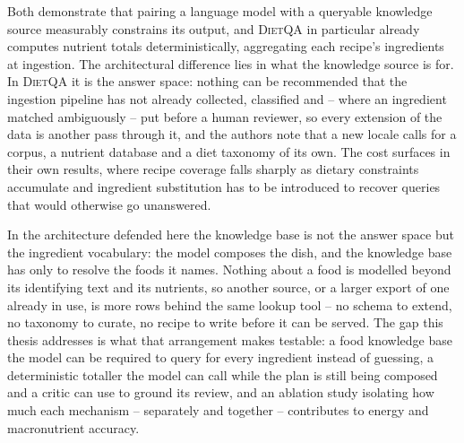 Both demonstrate that pairing a language model with a queryable knowledge source measurably constrains its output, and \textsc{DietQA} in particular already computes nutrient totals deterministically, aggregating each recipe's ingredients at ingestion. The architectural difference lies in what the knowledge source is for. In \textsc{DietQA} it is the answer space: nothing can be recommended that the ingestion pipeline has not already collected, classified and -- where an ingredient matched ambiguously -- put before a human reviewer, so every extension of the data is another pass through it, and the authors note that a new locale calls for a corpus, a nutrient database and a diet taxonomy of its own. The cost surfaces in their own results, where recipe coverage falls sharply as dietary constraints accumulate and ingredient substitution has to be introduced to recover queries that would otherwise go unanswered.

In the architecture defended here the knowledge base is not the answer space but the ingredient vocabulary: the model composes the dish, and the knowledge base has only to resolve the foods it names. Nothing about a food is modelled beyond its identifying text and its nutrients, so another source, or a larger export of one already in use, is more rows behind the same lookup tool -- no schema to extend, no taxonomy to curate, no recipe to write before it can be served. The gap this thesis addresses is what that arrangement makes testable: a food knowledge base the model can be required to query for every ingredient instead of guessing, a deterministic totaller the model can call while the plan is still being composed and a critic can use to ground its review, and an ablation study isolating how much each mechanism -- separately and together -- contributes to energy and macronutrient accuracy.
